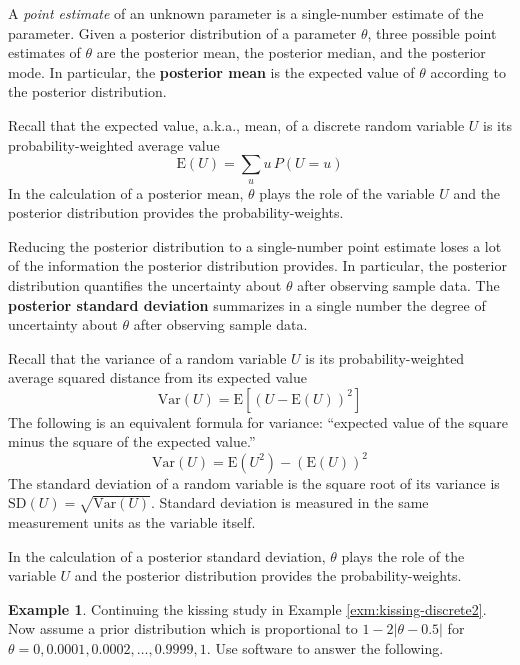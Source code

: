 \documentclass[
]{book}
\theoremstyle{definition}
\theoremstyle{definition}
\newtheorem{example}{Example}[chapter]
\theoremstyle{definition}
\theoremstyle{remark}
\begin{document}
A \emph{point estimate} of an unknown parameter is a single-number estimate of the parameter.
Given a posterior distribution of a parameter \(\theta\), three possible point estimates of \(\theta\) are the posterior mean, the posterior median, and the posterior mode. In particular, the \textbf{posterior mean} is the expected value of \(\theta\) according to the posterior distribution.

Recall that the expected value, a.k.a., mean, of a discrete random variable \(U\) is its probability-weighted average value
\[
\text{E}(U) = \sum_u u\, P(U = u)
\]
In the calculation of a posterior mean, \(\theta\) plays the role of the variable \(U\) and the posterior distribution provides the probability-weights.

Reducing the posterior distribution to a single-number point estimate loses a lot of the information the posterior distribution provides. In particular, the posterior distribution quantifies the uncertainty about \(\theta\) after observing sample data.
The \textbf{posterior standard deviation} summarizes in a single number the degree of uncertainty about \(\theta\) after observing sample data.

Recall that the variance of a random variable \(U\) is its probability-weighted average squared distance from its expected value
\[
\text{Var}(U) = \text{E}\left[\left(U - \text{E}(U)\right)^2\right] 
\]
The following is an equivalent formula for variance: ``expected value of the square minus the square of the expected value.''
\[
\text{Var}(U) = \text{E}(U^2) - \left(\text{E}(U)\right)^2
\]
The standard deviation of a random variable is the square root of its variance is \(\text{SD}(U)=\sqrt{\text{Var}(U)}\). Standard deviation is measured in the same measurement units as the variable itself.

In the calculation of a posterior standard deviation, \(\theta\) plays the role of the variable \(U\) and the posterior distribution provides the probability-weights.

\begin{example}
\protect\hypertarget{exm:kissing-summary2}{}{\label{exm:kissing-summary2} }
Continuing the kissing study in Example \ref{exm:kissing-discrete2}. Now assume a prior distribution which is proportional to \(1-2|\theta-0.5|\) for \(\theta = 0, 0.0001, 0.0002, \ldots, 0.9999, 1\). Use software to answer the following.
\end{example}
\end{document}
